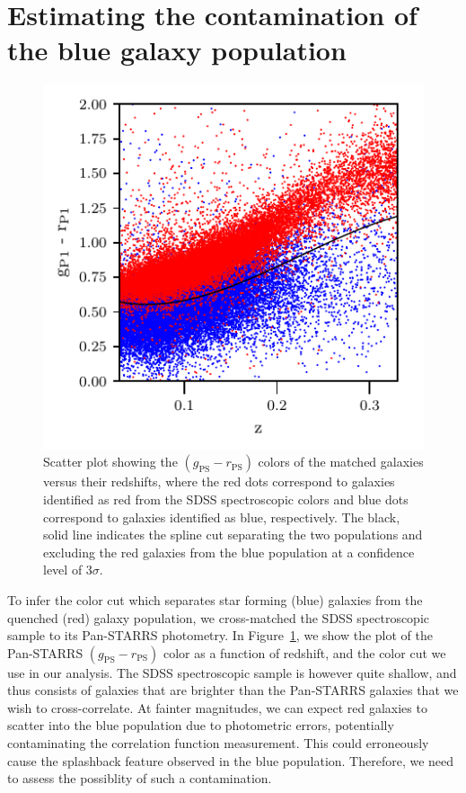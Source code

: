 \documentclass[iop, apjl, twocolappendix, numberedappendix]{emulateapj}
\begin{document}
\section{Estimating the contamination of the blue galaxy population}
\label{sec:Errors}

\begin{figure}
    \includegraphics[width= \textwidth]{color_vs_z.pdf}
\caption{Scatter plot showing the $(g_{\mathrm{PS}}-r_{\mathrm{PS}})$ colors
of the matched galaxies versus their redshifts, where the red dots correspond
to galaxies identified as red from the SDSS spectroscopic colors and blue dots
correspond to galaxies identified as blue, respectively. The black, solid line
indicates the spline cut separating the two populations and excluding the red 
galaxies from the blue population at a confidence level of $3 \sigma$.}
   \label{fig:g-r_vs_z} 
\end{figure}

To infer the color cut which separates star forming (blue) galaxies from the
quenched (red) galaxy population, we cross-matched the SDSS spectroscopic
sample to its Pan-STARRS photometry. In Figure~\ref{fig:g-r_vs_z}, we show the
plot of the Pan-STARRS $(g_{\mathrm{PS}}-r_{\mathrm{PS}})$ color as a 
function of redshift, and the color cut we use in our analysis. 
The SDSS spectroscopic sample is however quite shallow, 
and thus consists of galaxies that are brighter than the Pan-STARRS 
galaxies that we wish to cross-correlate. At fainter magnitudes, we can 
expect red galaxies to scatter into the blue population 
due to photometric errors, potentially contaminating the
correlation function measurement. This could erroneously cause the
splashback feature observed in the blue population. Therefore, we
need to assess the possiblity of such a contamination. 
\end{document}
